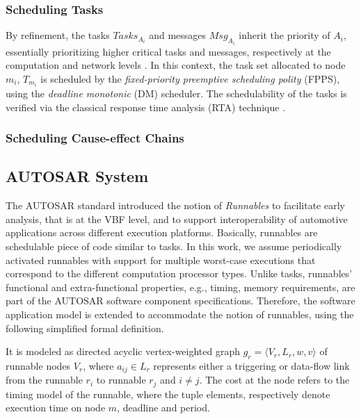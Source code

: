 \subsubsection{Scheduling Tasks}\label{subsec_responsetimeanalysis}
By refinement, the tasks $Tasks_{A_i}$ and messages $Msg_{A_i}$ inherit the priority of $A_i$, essentially prioritizing higher critical tasks and messages, respectively at the computation and network levels \cite{Baruah2011Response-timeSystems,Burns2013MixedNetwork}. In this context, the task set allocated to node $m_i$, $T_{m_i}$ is scheduled by the \textit{fixed-priority preemptive scheduling polity} (FPPS), using the \textit{deadline monotonic} (DM) scheduler. The schedulability of the tasks is verified via the classical response time analysis (RTA) technique \cite{Baruah2011Response-timeSystems}. 

\subsubsection{Scheduling Cause-effect Chains}\label{subsec_causeeffectchains}

\subsection{AUTOSAR System}
The AUTOSAR standard introduced the notion of \textit{Runnables} to facilitate early analysis, that is at the VBF level, and to support interoperability of automotive applications across different execution platforms. Basically, runnables are schedulable piece of code similar to tasks. In this work, we assume periodically activated runnables with support for multiple worst-case executions that correspond to the different computation processor types. Unlike tasks, runnables' functional and extra-functional properties, e.g., timing, memory requirements, are part of the AUTOSAR software component specifications. Therefore, the software application model is extended to accommodate the notion of runnables, using the following simplified formal definition.

\begin{definition}
It is modeled as directed acyclic vertex-weighted graph $g_r=\langle V_r, L_r, w, v\rangle$ of runnable nodes $V_r$, where $a_{ij}\in L_r$ represents either a triggering or data-flow link from the runnable $r_i$ to runnable $r_j$ and $i\neq j$. The cost at the node refers to the timing model of the runnable, where the tuple elements, respectively denote execution time on node $m$, deadline and period. 
\end{definition}

